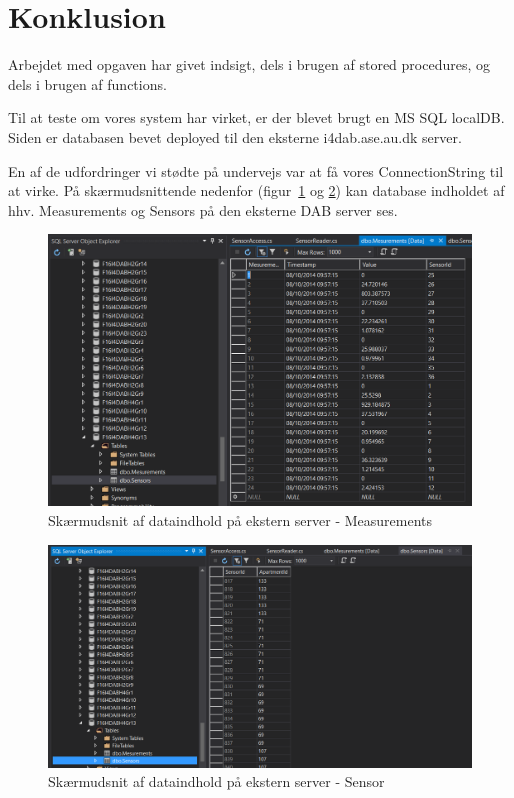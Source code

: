 \section{Konklusion}
Arbejdet med opgaven har givet indsigt, dels i brugen af stored procedures, og dels i brugen af functions.

Til at teste om vores system har virket, er der blevet brugt en MS SQL localDB. Siden er databasen bevet deployed til den eksterne i4dab.ase.au.dk server. 

En af de udfordringer vi stødte på undervejs var at få vores ConnectionString til at virke. På skærmudsnittende nedenfor (figur~\ref{fig:measurement_remote} og \ref{fig:sensor_remote}) kan database indholdet af hhv. Measurements og Sensors på den eksterne DAB server ses.

\begin{figure}
\centering
\includegraphics[width=\linewidth]{figs/measurement_remote}
\caption{Skærmudsnit af dataindhold på ekstern server - Measurements}
\label{fig:measurement_remote}
\end{figure}

\begin{figure}
	\centering
	\includegraphics[width=\linewidth]{figs/sensor_remote}
	\caption{Skærmudsnit af dataindhold på ekstern server - Sensor}
	\label{fig:sensor_remote}
\end{figure}